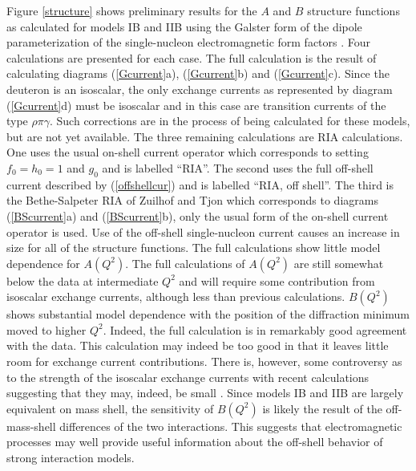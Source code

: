 \documentclass[mythesis.tex]{subfiles}
\begin{document}
Figure \ref{structure} shows preliminary results for the $A$ and $B$
structure functions as
calculated for models IB and IIB using the Galster form of the dipole
parameterization of the single-nucleon electromagnetic form factors
\cite{Gals71}.
Four calculations are presented for each
case. The full calculation is the result of calculating diagrams
(\ref{Gcurrent}a), (\ref{Gcurrent}b) and (\ref{Gcurrent}c). Since the
deuteron is an isoscalar, the only exchange currents as represented by
diagram (\ref{Gcurrent}d) must be isoscalar and in this case are transition
currents of the type $\rho\pi\gamma$. Such corrections are in the process
of being calculated for these models, but are not yet available. The three
remaining calculations are RIA calculations. One uses the usual on-shell
current operator which corresponds to setting $f_0=h_0=1$ and $g_0$ and is
labelled ``RIA''. The
second uses the full off-shell current described by (\ref{offshellcur}) and
is labelled ``RIA, off shell''.
The third is the Bethe-Salpeter RIA of Zuilhof and Tjon \cite{Zuilhof}
which corresponds
to diagrams (\ref{BScurrent}a) and (\ref{BScurrent}b), only the usual form
of the on-shell current operator is used. Use of the off-shell
single-nucleon current causes an increase in size for all of the structure
functions. The full calculations show little model dependence for $A(Q^2)$.
The full calculations of $A(Q^2)$ are still somewhat below the data at
intermediate $Q^2$ and will require some contribution from isoscalar
exchange currents, although less than previous calculations. $B(Q^2)$
shows substantial model dependence with the position of the diffraction
minimum moved to higher $Q^2$. Indeed, the full calculation is in remarkably
good agreement with the data.
This calculation may indeed be too good in that it leaves little room for
exchange current contributions. There is, however, some controversy as
to the strength of the isoscalar exchange currents with recent calculations
suggesting that they may, indeed, be small \cite{ItoGross}. Since models IB
and IIB are
largely equivalent on mass shell, the sensitivity of $B(Q^2)$ is likely
the result of the off-mass-shell differences of the two interactions. This
suggests that electromagnetic processes may well provide useful information
about the off-shell behavior of strong interaction models.
\end{document}

